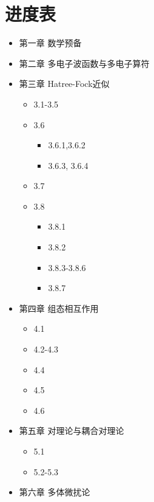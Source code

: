 \chapter*{进度表}
\begin{itemize}
    \item[\CheckedBox] 第一章  数学预备
    \item[\CheckedBox] 第二章  多电子波函数与多电子算符
    \item[\DSquare] 第三章  Hatree-Fock近似 
    	\begin{itemize}
		    \item[\CheckedBox] 3.1-3.5
		    \item[\DSquare] 3.6 
		    	\begin{itemize}
		            \item[\CheckedBox] 3.6.1,3.6.2
		            \item[\Square] 3.6.3, 3.6.4
		        \end{itemize}
		    \item[\Square] 3.7
		    \item[\DSquare] 3.8 
			   \begin{itemize}
				     \item[\CheckedBox] 3.8.1
				     \item[\DSquare] 3.8.2
				     \item[\Square] 3.8.3-3.8.6
				     \item[\DSquare] 3.8.7
			   \end{itemize}
    	\end{itemize}
    \item[\DSquare] 
    	第四章 组态相互作用 
	    \begin{itemize}
	        \item[\DSquare] 4.1
	        \item[\Square] 4.2-4.3
	        \item[\CheckedBox] 4.4
	        \item[\DSquare] 4.5
		\item[\Square] 4.6
	    \end{itemize}
    \item[\DSquare] 第五章 对理论与耦合对理论 
	    \begin{itemize}
	        \item[\DSquare] 5.1
	        \item[\Square] 5.2-5.3
	    \end{itemize}
    \item[\CheckedBox] 第六章 多体微扰论 

\end{itemize}
